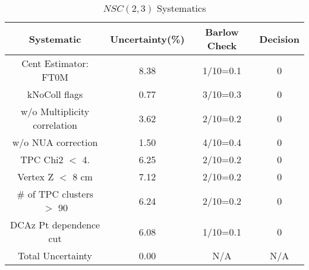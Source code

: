 \begin{table}[htbp]
\caption{$NSC(2,3)$ Systematics}
\label{tab:Sys_NSC23}
\centering
\begin{tabular}{|c|c|c|c|}
\hline
Systematic & Uncertainty(\%) & Barlow Check & Decision \\
\hline
Cent Estimator: FT0M & 8.38 & 1/10=0.1 & 0 \\
kNoColl flags & 0.77 & 3/10=0.3 & 0 \\
w/o Multiplicity correlation & 3.62 & 2/10=0.2 & 0 \\
w/o NUA correction & 1.50 & 4/10=0.4 & 0 \\
TPC Chi2 $<$ 4. & 6.25 & 2/10=0.2 & 0 \\
Vertex Z $<$ 8 cm & 7.12 & 2/10=0.2 & 0 \\
\# of TPC clusters $>$ 90 & 6.24 & 2/10=0.2 & 0 \\
DCAz Pt dependence cut & 6.08 & 1/10=0.1 & 0 \\
\hline
Total Uncertainty & 0.00 & N/A & N/A \\
\hline
\end{tabular}
\end{table}
